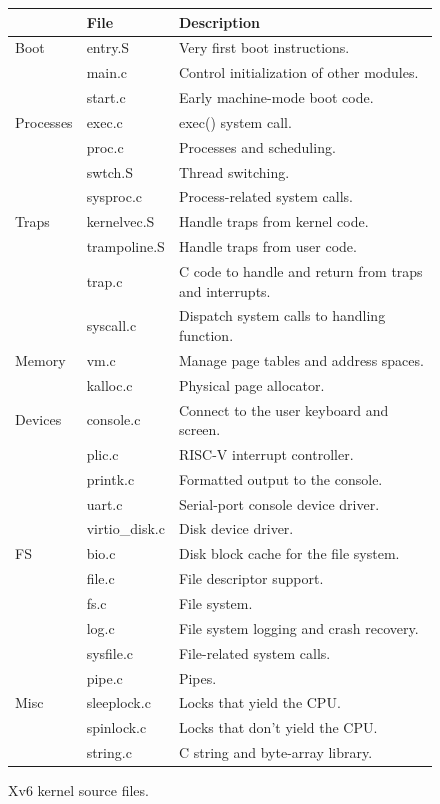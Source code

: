 \begin{figure}[t]
\center
\begin{tabular}{l|l|l}
& {\bf File} & {\bf Description} \\
\midrule
Boot & entry.S & Very first boot instructions. \\
 & main.c & Control initialization of other modules. \\
 & start.c & Early machine-mode boot code. \\
Processes & exec.c & exec() system call. \\
 & proc.c & Processes and scheduling. \\
 & swtch.S & Thread switching. \\
 & sysproc.c & Process-related system calls. \\
Traps & kernelvec.S & Handle traps from kernel code. \\
 & trampoline.S & Handle traps from user code. \\
 & trap.c & C code to handle and return from traps and interrupts. \\
 & syscall.c & Dispatch system calls to handling function. \\
Memory & vm.c & Manage page tables and address spaces. \\
 & kalloc.c & Physical page allocator. \\
Devices & console.c & Connect to the user keyboard and screen. \\
 & plic.c & RISC-V interrupt controller. \\
 & printk.c & Formatted output to the console. \\
 & uart.c & Serial-port console device driver. \\
 & virtio\_disk.c & Disk device driver. \\
FS & bio.c & Disk block cache for the file system. \\
 & file.c & File descriptor support. \\
 & fs.c & File system. \\
 & log.c & File system logging and crash recovery. \\
 & sysfile.c & File-related system calls. \\
 & pipe.c & Pipes. \\
Misc & sleeplock.c & Locks that yield the CPU. \\
 & spinlock.c & Locks that don't yield the CPU. \\
 & string.c & C string and byte-array library. \\
\end{tabular}
\caption{Xv6 kernel source files.}
\label{fig:source}
\end{figure}


